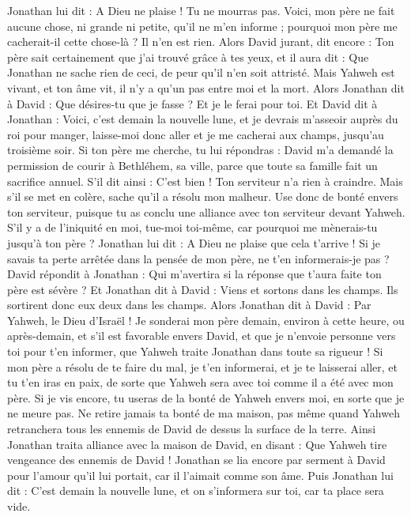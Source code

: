 \begin{multicols}{2}
Jonathan lui dit : A Dieu ne plaise ! Tu ne mourras pas. Voici, mon père ne fait aucune chose, ni grande ni petite, qu'il ne m'en informe ; pourquoi mon père me cacherait-il cette chose-là ? Il n'en est rien.
Alors David jurant, dit encore : Ton père sait certainement que j'ai trouvé grâce à tes yeux, et il aura dit : Que Jonathan ne sache rien de ceci, de peur qu'il n'en soit attristé. Mais Yahweh est vivant, et ton âme vit, il n'y a qu'un pas entre moi et la mort.
Alors Jonathan dit à David : Que désires-tu que je fasse ? Et je le ferai pour toi.
Et David dit à Jonathan : Voici, c'est demain la nouvelle lune, et je devrais m'asseoir auprès du roi pour manger, laisse-moi donc aller et je me cacherai aux champs, jusqu'au troisième soir.
Si ton père me cherche, tu lui répondras : David m'a demandé la permission de courir à Bethléhem, sa ville, parce que toute sa famille fait un sacrifice annuel.
S'il dit ainsi : C'est bien ! Ton serviteur n'a rien à craindre. Mais s'il se met en colère, sache qu'il a résolu mon malheur.
Use donc de bonté envers ton serviteur, puisque tu as conclu une alliance avec ton serviteur devant Yahweh. S'il y a de l'iniquité en moi, tue-moi toi-même, car pourquoi me mènerais-tu jusqu'à ton père ?
Jonathan lui dit : A Dieu ne plaise que cela t'arrive ! Si je savais ta perte arrêtée dans la pensée de mon père, ne t'en informerais-je pas ?
David répondit à Jonathan : Qui m'avertira si la réponse que t'aura faite ton père est sévère ?
Et Jonathan dit à David : Viens et sortons dans les champs. Ils sortirent donc eux deux dans les champs.
Alors Jonathan dit à David : Par Yahweh, le Dieu d'Israël ! Je sonderai mon père demain, environ à cette heure, ou après-demain, et s'il est favorable envers David, et que je n'envoie personne vers toi pour t'en informer,
que Yahweh traite Jonathan dans toute sa rigueur ! Si mon père a résolu de te faire du mal, je t'en informerai, et je te laisserai aller, et tu t'en iras en paix, de sorte que Yahweh sera avec toi comme il a été avec mon père.
Si je vis encore, tu useras de la bonté de Yahweh envers moi, en sorte que je ne meure pas.
Ne retire jamais ta bonté de ma maison, pas même quand Yahweh retranchera tous les ennemis de David de dessus la surface de la terre.
Ainsi Jonathan traita alliance avec la maison de David, en disant : Que Yahweh tire vengeance des ennemis de David !
Jonathan se lia encore par serment à David pour l'amour qu'il lui portait, car il l'aimait comme son âme.
Puis Jonathan lui dit : C'est demain la nouvelle lune, et on s'informera sur toi, car ta place sera vide.

\end{multicols}
